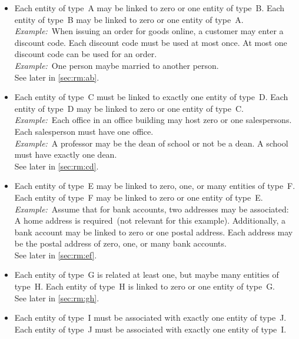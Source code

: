 \begin{itemize}%
%
\item {} %
Each entity of type~A may be linked to zero or one entity of type~B.
Each entity of type~B may be linked to zero or one entity of type~A.~\cite{BS2023G:CFNIERD}\\%
\emph{Example:}~When issuing an order for goods online, a customer may enter a discount code.
Each discount code must be used at most once.
At most one discount code can be used for an order.~\cite{BS2023G:CFNIERD}\\%
\emph{Example:}~One person maybe married to another person.~\cite{R2024CDS:E}\\%
See later in \cref{sec:rm:ab}.%
%
\item {}
Each entity of type~C must be linked to exactly one entity of type~D.
Each entity of type~D may be linked to zero or one entity of type~C.~\cite{T2025CDBMS:ERM}\\%
\emph{Example:}~Each office in an office building may host zero or one salespersons.
Each salesperson must have one office.~\cite{T2025CDBMS:ERM}\\%
\emph{Example:}~A professor may be the dean of school or not be a dean.
A school must have exactly one dean.~\cite{R2024CDS:E}\\%
See later in \cref{sec:rm:cd}.%
%
\item {}
Each entity of type~E may be linked to zero, one, or many entities of type~F.
Each entity of type~F may be linked to zero or one entity of type~E.~\cite{MA2006MAC:DMERDED}\\%
\emph{Example:}~Assume that for bank accounts, two addresses may be associated:
A home address is required~(not relevant for this example).
Additionally, a bank account may be linked to zero or one postal address.
Each address may be the postal address of zero, one, or many bank accounts.~\cite{MA2006MAC:DMERDED}\\%
See later in \cref{sec:rm:ef}.%
%
\item {}
Each entity of type~G is related at least one, but maybe many entities of type~H.
Each entity of type~H is linked to zero or one entity of type~G.\\%
See later in \cref{sec:rm:gh}.%
%
\item {}
Each entity of type~I must be associated with exactly one entity of type~J.
Each entity of type~J must be associated with exactly one entity of type~I.\\%

\end{itemize}
